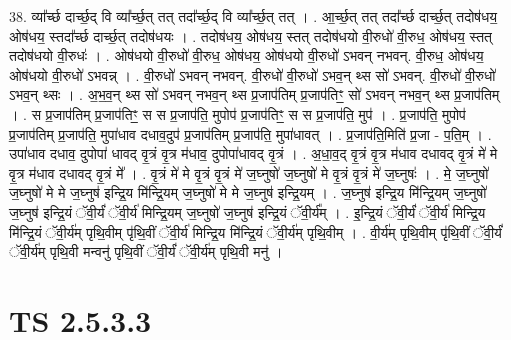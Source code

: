 \documentclass[17pt]{extarticle}
\begin{document}
38. व्या᳚र्च्छ दार्च्छ॒द् वि व्या᳚र्च्छ॒त् तत् तदा᳚र्च्छ॒द् वि व्या᳚र्च्छ॒त् तत् । . आ॒र्च्छ॒त् तत् तदा᳚र्च्छ दार्च्छ॒त् तदोष॑धय॒ ओष॑धय॒ स्तदा᳚र्च्छ दार्च्छ॒त् तदोष॑धयः । . तदोष॑धय॒ ओष॑धय॒ स्तत् तदोष॑धयो वी॒रुधो॑ वी॒रुध॒ ओष॑धय॒ स्तत् तदोष॑धयो वी॒रुधः॑ । . ओष॑धयो वी॒रुधो॑ वी॒रुध॒ ओष॑धय॒ ओष॑धयो वी॒रुधो॑ ऽभवन् नभवन्. वी॒रुध॒ ओष॑धय॒ ओष॑धयो वी॒रुधो॑ ऽभवन्न् । . वी॒रुधो॑ ऽभवन् नभवन्. वी॒रुधो॑ वी॒रुधो॑ ऽभव॒न् थ्स सो॑ ऽभवन्. वी॒रुधो॑ वी॒रुधो॑ ऽभव॒न् थ्सः । . अ॒भ॒व॒न् थ्स सो॑ ऽभवन् नभव॒न् थ्स प्र॒जाप॑तिम् प्र॒जाप॑तिꣳ॒॒ सो॑ ऽभवन् नभव॒न् थ्स प्र॒जाप॑तिम् । . स प्र॒जाप॑तिम् प्र॒जाप॑तिꣳ॒॒ स स प्र॒जाप॑ति॒ मुपोप॑ प्र॒जाप॑तिꣳ॒॒ स स प्र॒जाप॑ति॒ मुप॑ । . प्र॒जाप॑ति॒ मुपोप॑ प्र॒जाप॑तिम् प्र॒जाप॑ति॒ मुपा॑धाव दधाव॒दुप॑ प्र॒जाप॑तिम् प्र॒जाप॑ति॒ मुपा॑धावत् । . प्र॒जाप॑ति॒मिति॑ प्र॒जा - प॒ति॒म् । . उपा॑धाव दधाव॒ दुपोपा॑ धावद् वृ॒त्रं वृ॒त्र म॑धाव॒ दुपोपा॑धावद् वृ॒त्रं । . अ॒धा॒व॒द् वृ॒त्रं वृ॒त्र म॑धाव दधावद् वृ॒त्रं मे॑ मे वृ॒त्र म॑धाव दधावद् वृ॒त्रं मे᳚ । . वृ॒त्रं मे॑ मे वृ॒त्रं वृ॒त्रं मे॑ ज॒घ्नुषो॑ ज॒घ्नुषो॑ मे वृ॒त्रं वृ॒त्रं मे॑ ज॒घ्नुषः॑ । . मे॒ ज॒घ्नुषो॑ ज॒घ्नुषो॑ मे मे ज॒घ्नुष॑ इन्द्रि॒य मि॑न्द्रि॒यम् ज॒घ्नुषो॑ मे मे ज॒घ्नुष॑ इन्द्रि॒यम् । . ज॒घ्नुष॑ इन्द्रि॒य मि॑न्द्रि॒यम् ज॒घ्नुषो॑ ज॒घ्नुष॑ इन्द्रि॒यं ॅवी॒र्यं॑ ॅवी॒र्य॑ मिन्द्रि॒यम् ज॒घ्नुषो॑ ज॒घ्नुष॑ इन्द्रि॒यं ॅवी॒र्य᳚म् । . इ॒न्द्रि॒यं ॅवी॒र्यं॑ ॅवी॒र्य॑ मिन्द्रि॒य मि॑न्द्रि॒यं ॅवी॒र्य॑म् पृथि॒वीम् पृ॑थि॒वीं ॅवी॒र्य॑ मिन्द्रि॒य मि॑न्द्रि॒यं ॅवी॒र्य॑म् पृथि॒वीम् । . वी॒र्य॑म् पृथि॒वीम् पृ॑थि॒वीं ॅवी॒र्यं॑ ॅवी॒र्य॑म् पृथि॒वी मन्वनु॑ पृथि॒वीं ॅवी॒र्यं॑ ॅवी॒र्य॑म् पृथि॒वी मनु॑ । \newline
\pagebreak
{}
\section*{ TS 2.5.3.3 }
\end{document}
